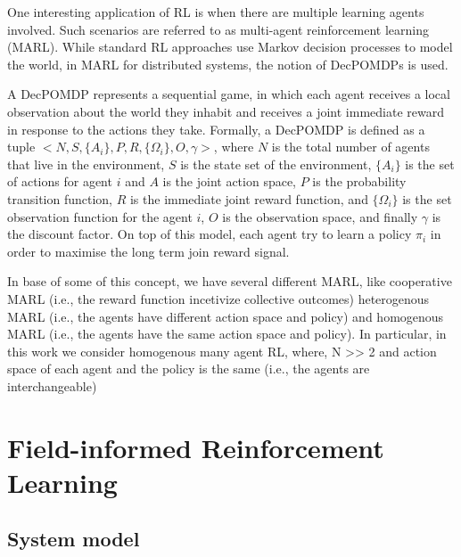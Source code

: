\documentclass[conference]{IEEEtran}
\begin{document}
One interesting application of RL is when there are multiple learning agents involved. 
 Such scenarios are referred to as multi-agent reinforcement learning (MARL). 
 While standard RL approaches use Markov decision processes to model the world, 
 in MARL for distributed systems, the notion of 
 \acp{DecPOMDP} is used.

A \ac{DecPOMDP} represents a sequential game, 
 in which each agent receives a local observation about the world they 
 inhabit and receives a joint immediate reward in response to the actions they take. 
% 
Formally, a DecPOMDP is defined as a tuple $<N, S, \{A_i\}, P, R, \{\Omega_i\}, O, \gamma>$, 
 where $N$ is the total number of agents that live in the environment, 
 $S$ is the state set of the environment, 
 $\{A_i\}$ is the set of actions for agent $i$ and $A$ is the joint action space, 
 $P$ is the probability transition function, 
 $R$ is the immediate joint reward function, and 
 $\{\Omega_i\}$ is the set observation function for the agent $i$,
 $O$ is the observation space, and finally $\gamma$ is the discount factor.
%
On top of this model, each agent try to learn a policy $\pi_i$ in order 
 to maximise the long term join reward signal.

In base of some of this concept, 
 we have several different MARL, like cooperative MARL (i.e., the reward function incetivize collective outcomes)
 heterogenous MARL (i.e., the agents have different action space and policy) and
 homogenous MARL (i.e., the agents have the same action space and policy).
%  
In particular, in this work we consider homogenous many agent RL, 
 where, N >> 2 and action space of each agent and the policy is the same (i.e., the agents are interchangeable)
\section{Field-informed Reinforcement Learning}
\label{sec:approach}
\subsection{System model}
\end{document}
